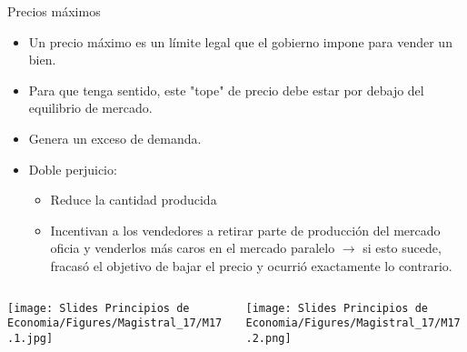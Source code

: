 \documentclass{beamer}
\begin{document}
\begin{frame}{Precios máximos}
\begin{itemize}
    \item Un precio máximo es un límite legal que el gobierno impone para vender un bien.
    \item Para que tenga sentido, este "tope" de precio debe estar por debajo del equilibrio de mercado. 
    \item Genera un exceso de demanda.
    \item Doble perjuicio:
        \begin{itemize}
        \item Reduce la cantidad producida
        \item Incentivan a los vendedores a retirar parte de producción del mercado oficia y venderlos más caros en el mercado paralelo $\rightarrow$ si esto sucede, fracasó el objetivo de bajar el precio y ocurrió exactamente lo contrario.
        \end{itemize}
\end{itemize}
\vspace{2mm}
\begin{columns}
    \begin{column}{0.49\textwidth}
    \centering
    \hfill
    \texttt{[image: Slides Principios de Economia/Figures/Magistral\_17/M17.1.jpg]}    
    \end{column}
    \begin{column}{0.49\textwidth}
    \centering
    \texttt{[image: Slides Principios de Economia/Figures/Magistral\_17/M17.2.png]}    
    \hfill
    \end{column}
\end{columns}

\end{frame}
\end{document}
